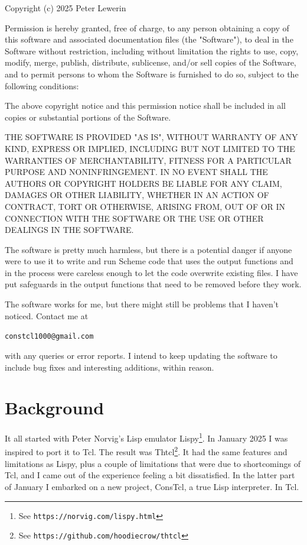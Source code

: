 \documentclass[a5paper,draft]{memoir}
\begin{document}
Copyright (c) 2025 Peter Lewerin

Permission is hereby granted, free of charge, to any person obtaining a copy
of this software and associated documentation files (the "Software"), to deal
in the Software without restriction, including without limitation the rights
to use, copy, modify, merge, publish, distribute, sublicense, and/or sell
copies of the Software, and to permit persons to whom the Software is
furnished to do so, subject to the following conditions:

The above copyright notice and this permission notice shall be included in all
copies or substantial portions of the Software.

THE SOFTWARE IS PROVIDED "AS IS", WITHOUT WARRANTY OF ANY KIND, EXPRESS OR
IMPLIED, INCLUDING BUT NOT LIMITED TO THE WARRANTIES OF MERCHANTABILITY,
FITNESS FOR A PARTICULAR PURPOSE AND NONINFRINGEMENT\@. IN NO EVENT SHALL THE
AUTHORS OR COPYRIGHT HOLDERS BE LIABLE FOR ANY CLAIM, DAMAGES OR OTHER
LIABILITY, WHETHER IN AN ACTION OF CONTRACT, TORT OR OTHERWISE, ARISING FROM,
OUT OF OR IN CONNECTION WITH THE SOFTWARE OR THE USE OR OTHER DEALINGS IN THE
SOFTWARE.

The software is pretty much harmless, but there is a potential danger if anyone
were to use it to write and run Scheme code that uses the output functions and
in the process were careless enough to let the code overwrite existing files. I
have put safeguards in the output functions that need to be removed before they
work.

The software works for me, but there might still be problems that I haven't
noticed. Contact me at

\indent \texttt{constcl1000@gmail.com}

with any queries or error reports. I intend to keep updating the software to
include bug fixes and interesting additions, within reason.

\section*{Background}
\label{background}

It all started with Peter Norvig's Lisp emulator
Lispy\footnote{See \texttt{https://norvig.com/lispy.html}}. In January 2025 I
was inspired to port it to Tcl. The result was Thtcl\footnote{See
\texttt{https://github.com/hoodiecrow/thtcl}}. It had the same features and
limitations as Lispy, plus a couple of limitations that were due to
shortcomings of Tcl, and I came out of the experience feeling a bit
dissatisfied. In the latter part of January I embarked on a new project,
ConsTcl, a true Lisp interpreter. In Tcl.
\end{document}
